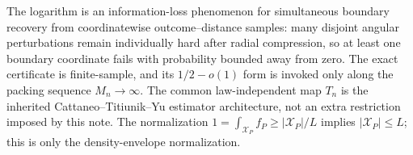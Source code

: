 The logarithm is an information-loss phenomenon for simultaneous boundary recovery from coordinatewise outcome--distance samples: many disjoint angular perturbations remain individually hard after radial compression, so at least one boundary coordinate fails with probability bounded away from zero.  The exact certificate is finite-sample, and its \(1/2-o(1)\) form is invoked only along the packing sequence \(M_n\to\infty\).  The common law-independent map \(T_n\) is the inherited Cattaneo--Titiunik--Yu estimator architecture, not an extra restriction imposed by this note.  The normalization \(1=\int_{\mathcal X_P}f_P\geq|\mathcal X_P|/L\) implies \(|\mathcal X_P|\leq L\); this is only the density-envelope normalization.